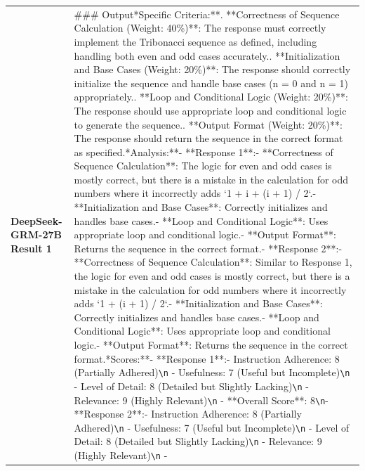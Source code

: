 \documentclass{article} %
\newcommand{\SGRM}{DeepSeek-GRM-27B\xspace}
\begin{document}
\begin{center}
\begin{longtable}{p{2.5cm}|p{10cm}}
   \textbf{\SGRM Result 1}   &    \#\#\# Output\newline\newline**Specific Criteria:**\newline1. **Correctness of Sequence Calculation (Weight: 40\%)**: The response must correctly implement the Tribonacci sequence as defined, including handling both even and odd cases accurately.\newline2. **Initialization and Base Cases (Weight: 20\%)**: The response should correctly initialize the sequence and handle base cases (n = 0 and n = 1) appropriately.\newline3. **Loop and Conditional Logic (Weight: 20\%)**: The response should use appropriate loop and conditional logic to generate the sequence.\newline4. **Output Format (Weight: 20\%)**: The response should return the sequence in the correct format as specified.\newline\newline**Analysis:**\newline- **Response 1**:\newline  - **Correctness of Sequence Calculation**: The logic for even and odd cases is mostly correct, but there is a mistake in the calculation for odd numbers where it incorrectly adds `1 + i + (i + 1) / 2`.\newline  - **Initialization and Base Cases**: Correctly initializes and handles base cases.\newline  - **Loop and Conditional Logic**: Uses appropriate loop and conditional logic.\newline  - **Output Format**: Returns the sequence in the correct format.\newline\newline- **Response 2**:\newline  - **Correctness of Sequence Calculation**: Similar to Response 1, the logic for even and odd cases is mostly correct, but there is a mistake in the calculation for odd numbers where it incorrectly adds `1 + (i + 1) / 2`.\newline  - **Initialization and Base Cases**: Correctly initializes and handles base cases.\newline  - **Loop and Conditional Logic**: Uses appropriate loop and conditional logic.\newline  - **Output Format**: Returns the sequence in the correct format.\newline\newline**Scores:**\newline- **Response 1**:\newline  - Instruction Adherence: 8 (Partially Adhered)\verb|\n|  - Usefulness: 7 (Useful but Incomplete)\verb|\n|  - Level of Detail: 8 (Detailed but Slightly Lacking)\verb|\n|  - Relevance: 9 (Highly Relevant)\verb|\n|  - **Overall Score**: 8\verb|\n|\newline- **Response 2**:\newline  - Instruction Adherence: 8 (Partially Adhered)\verb|\n|  - Usefulness: 7 (Useful but Incomplete)\verb|\n|  - Level of Detail: 8 (Detailed but Slightly Lacking)\verb|\n|  - Relevance: 9 (Highly Relevant)\verb|\n|  - 
\end{longtable}
\end{center}
\end{document}
